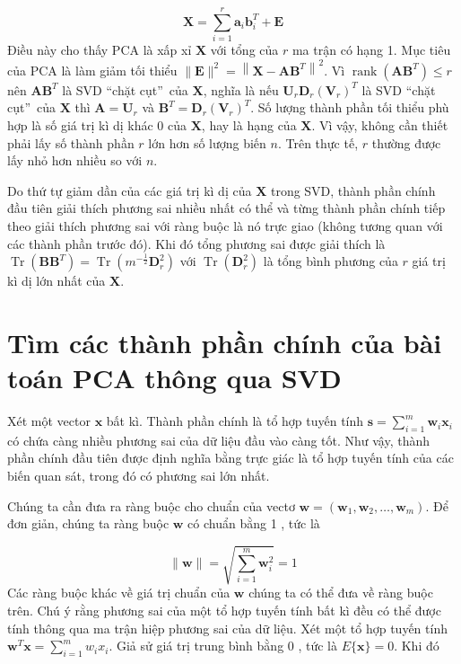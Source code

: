 \documentclass[12pt,a4paper,oneside]{report}
\numberwithin{equation}{section}
\begin{document}
$$
\mathbf{X}=\sum_{i=1}^{r} \mathbf{a}_{i} \mathbf{b}_{i}^{T}+\mathbf{E}
$$
Điều này cho thấy $\mathrm{PCA}$ là xấp xỉ $\mathbf{X}$ với tổng của $r$ ma trận có hạng 1.
Mục tiêu của PCA là làm giảm tối thiểu $\|\mathbf{E}\|^{2}=\left\|\mathbf{X}-\mathbf{A} \mathbf{B}^{T}\right\|^{2}$. Vì $\operatorname{rank}\left(\mathbf{A} \mathbf{B}^{T}\right) \leq r$ nên $\mathbf{A} \mathbf{B}^{T}$ là SVD \textquotedblleft chặt cụt\textquotedblright\ của $\mathbf{X}$, nghĩa là nếu $\mathbf{U}_{r} \mathbf{D}_{r}\left(\mathbf{V}_{r}\right)^{T}$ là SVD \textquotedblleft chặt cụt\textquotedblright\   của $\mathbf{X}$ thì $\mathbf{A}= \mathbf{U}_{r}$ và $\mathbf{B}^{T}= \mathbf{D}_{r}\left(\mathbf{V}_{r}\right)^{T}$. Số lượng thành phần tối thiểu phù hợp là số giá trị kì dị khác 0 của $\mathbf{X}$, hay là hạng của $\mathbf{X}$. Vì vậy, không cần thiết phải lấy số thành phần $r$ lớn hơn số lượng biến $n$. Trên thực tế, $r$ thường được lấy nhỏ hơn nhiều so với $n$.

Do thứ tự giảm dần của các giá trị kì dị của $\mathbf{X}$ trong SVD, thành phần chính đầu tiên giải thích phương sai nhiều nhất có thể và từng thành phần chính tiếp theo giải thích phương sai với ràng buộc là nó trực giao (không tương quan với các thành phần trước đó). Khi đó tổng phương sai được giải thích là $\operatorname{Tr}\left(\mathbf{B} \mathbf{B}^{T}\right)=\operatorname{Tr}\left(m^{-\frac{1}{2}} \mathbf{D}_{r}^{2}\right)$ với $\operatorname{Tr}\left(\mathbf{D}_{r}^{2}\right)$ là tổng bình phương của $r$ giá trị kì dị lớn nhất của $\mathbf{X}$.

\section{Tìm các thành phần chính của bài toán PCA thông qua SVD}

Xét một vector $\mathbf{x}$ bất kì. Thành phần chính là tổ hợp tuyến tính $\mathbf{s}=\sum_{i=1}^{m} \mathbf{w}_{i} \mathbf{x}_{i}$ có chứa càng nhiều phương sai của dữ liệu đầu vào càng tốt. Như vậy, thành phần chính đầu tiên được định nghĩa bằng trực giác là tổ hợp tuyến tính của các biến quan sát, trong đó có phương sai lớn nhất.

Chúng ta cần đưa ra ràng buộc cho chuẩn của vectơ $\mathbf{w}=\left(\mathbf{w}_{1}, \mathbf{w}_{2}, \ldots, \mathbf{w}_{m}\right)$. Để đơn giản, chúng ta ràng buộc $\mathbf{w}$ có chuẩn bằng 1 , tức là

$$
\|\mathbf{w}\|=\sqrt{\sum_{i=1}^{m} \mathbf{w}_{i}^{2}}=1
$$
Các ràng buộc khác về giá trị chuẩn của $\mathbf{w}$ chúng ta có thể đưa về ràng buộc trên.
Chú ý rằng phương sai của một tổ hợp tuyến tính bất kì đều có thể được tính thông qua ma trận hiệp phương sai của dữ liệu. Xét một tổ hợp tuyến tính $\mathbf{w}^{T} \mathbf{x}=\sum_{i=1}^{m} w_{i} x_{i}$. Giả sử giá trị trung bình bằng 0 , tức là $E\{\mathbf{x}\}=0$. Khi đó
\end{document}
